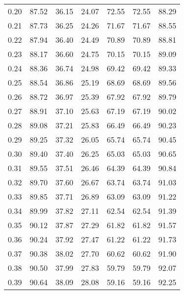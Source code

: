 \begin{tabular}{|c|c|c|c|c|c|c|}
      0.20 &     87.52 &     36.15 &      24.07 &   72.55 &      72.55 &         88.29 \\
      0.21 &     87.73 &     36.25 &      24.26 &   71.67 &      71.67 &         88.55 \\
      0.22 &     87.94 &     36.40 &      24.49 &   70.89 &      70.89 &         88.81 \\
      0.23 &     88.17 &     36.60 &      24.75 &   70.15 &      70.15 &         89.09 \\
      0.24 &     88.36 &     36.74 &      24.98 &   69.42 &      69.42 &         89.33 \\
      0.25 &     88.54 &     36.86 &      25.19 &   68.69 &      68.69 &         89.56 \\
      0.26 &     88.72 &     36.97 &      25.39 &   67.92 &      67.92 &         89.79 \\
      0.27 &     88.91 &     37.10 &      25.63 &   67.19 &      67.19 &         90.02 \\
      0.28 &     89.08 &     37.21 &      25.83 &   66.49 &      66.49 &         90.23 \\
      0.29 &     89.25 &     37.32 &      26.05 &   65.74 &      65.74 &         90.45 \\
      0.30 &     89.40 &     37.40 &      26.25 &   65.03 &      65.03 &         90.65 \\
      0.31 &     89.55 &     37.51 &      26.46 &   64.39 &      64.39 &         90.84 \\
      0.32 &     89.70 &     37.60 &      26.67 &   63.74 &      63.74 &         91.03 \\
      0.33 &     89.85 &     37.71 &      26.89 &   63.09 &      63.09 &         91.22 \\
      0.34 &     89.99 &     37.82 &      27.11 &   62.54 &      62.54 &         91.39 \\
      0.35 &     90.12 &     37.87 &      27.29 &   61.82 &      61.82 &         91.57 \\
      0.36 &     90.24 &     37.92 &      27.47 &   61.22 &      61.22 &         91.73 \\
      0.37 &     90.38 &     38.02 &      27.70 &   60.62 &      60.62 &         91.90 \\
      0.38 &     90.50 &     37.99 &      27.83 &   59.79 &      59.79 &         92.07 \\
      0.39 &     90.64 &     38.09 &      28.08 &   59.16 &      59.16 &         92.25 \\

\end{tabular}
